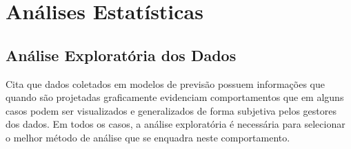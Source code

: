 \documentclass[	12pt, Times, openright, twoside, a4paper, english, brazil]{abntex2}
\begin{document}






      \section{Análises Estatísticas}
        \subsection{Análise Exploratória dos Dados}
          \cite{Junior2007} Cita que dados coletados em modelos de previsão possuem informações que quando são projetadas graficamente evidenciam comportamentos que em alguns casos podem ser visualizados e generalizados de forma subjetiva pelos gestores dos dados.  
          Em todos os casos, a análise exploratória é necessária para selecionar o melhor método de análise que se enquadra neste comportamento.
\end{document}
